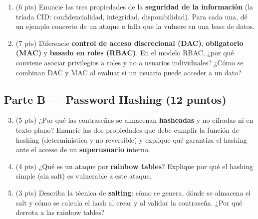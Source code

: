 \documentclass[11pt,a4paper]{article}
\begin{document}
\begin{enumerate}
  \item (6 pts) Enuncie las tres propiedades de la \textbf{seguridad de la información} (la tríada CID: confidencialidad, integridad, disponibilidad). Para cada una, dé un ejemplo concreto de un ataque o falla que la vulnere en una base de datos.

  \vspace{4cm}

  \item (7 pts) Diferencie \textbf{control de acceso discrecional (DAC)}, \textbf{obligatorio (MAC)} y \textbf{basado en roles (RBAC)}. En el modelo RBAC, ¿por qué conviene asociar privilegios a roles y no a usuarios individuales? ¿Cómo se combinan DAC y MAC al evaluar si un usuario puede acceder a un dato?

  \vspace{4.5cm}
\end{enumerate}

\subsection*{Parte B — Password Hashing (12 puntos)}

\begin{enumerate}
  \setcounter{enumi}{2}
  \item (5 pts) ¿Por qué las contraseñas se almacenan \textbf{hasheadas} y no cifradas ni en texto plano? Enuncie las dos propiedades que debe cumplir la función de hashing (determinística y no reversible) y explique qué garantiza el hashing ante el acceso de un \textbf{superusuario} interno.

  \vspace{3.5cm}

  \item (4 pts) ¿Qué es un ataque por \textbf{rainbow tables}? Explique por qué el hashing simple (sin salt) es vulnerable a este ataque.

  \vspace{3cm}

  \item (3 pts) Describa la técnica de \textbf{salting}: cómo se genera, dónde se almacena el salt y cómo se calcula el hash al crear y al validar la contraseña. ¿Por qué derrota a las rainbow tables?

  \vspace{3.5cm}
\end{enumerate}

\newpage
\end{document}
